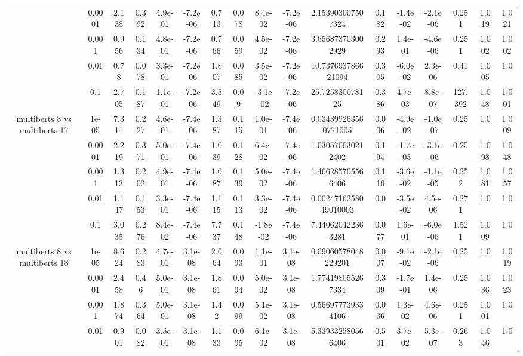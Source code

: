 \begin{tabular}{|c|c|c|c|c|c|c|c|c|c|c|c|c|c|c|c|c|}
 & 0.0001 & 2.138 & 0.392 & 4.9e-01 & -7.2e-06 & 0.713 & 0.078 & 8.4e-02 & -7.2e-06 & 2.153903007507324 & 0.182 & -1.4e-02 & -2.1e-06 & 0.251 & 1.019 & 1.021 \\
 & 0.001 & 0.956 & 0.134 & 4.8e-01 & -7.2e-06 & 0.766 & 0.059 & 4.5e-02 & -7.2e-06 & 3.656873703002929 & 0.293 & 1.4e-01 & -4.6e-06 & 0.251 & 1.002 & 1.002 \\
 & 0.01 & 0.78 & 0.078 & 3.3e-01 & -7.2e-06 & 1.807 & 0.085 & 3.5e-02 & -7.2e-06 & 10.737693786621094 & 0.305 & -6.0e-02 & 2.3e-06 & 0.41 & 1.005 & 1.0 \\
 & 0.1 & 2.705 & 0.187 & 1.1e-01 & -7.2e-06 & 3.549 & 0.09 & -3.1e-02 & -7.2e-06 & 25.725830078125 & 0.386 & 4.7e-03 & 8.8e-07 & 127.392 & 1.048 & 1.001 \\
\hline
\multirow{5}{*}{multiberts 8 vs multiberts 17} & 1e-05 & 7.311 & 0.227 & 4.6e-01 & -7.4e-06 & 1.387 & 0.115 & 1.0e-01 & -7.4e-06 & 0.034399263560771005 & 0.006 & -4.9e-02 & -1.0e-07 & 0.25 & 1.0 & 1.009 \\
 & 0.0001 & 2.219 & 0.371 & 5.0e-01 & -7.4e-06 & 1.039 & 0.128 & 6.4e-02 & -7.4e-06 & 1.030570030212402 & 0.194 & -1.7e-03 & -3.1e-06 & 0.25 & 1.098 & 1.048 \\
 & 0.001 & 1.313 & 0.202 & 4.9e-01 & -7.4e-06 & 1.087 & 0.139 & 5.0e-02 & -7.4e-06 & 1.466285705566406 & 0.118 & -3.6e-02 & -1.1e-05 & 0.252 & 1.081 & 1.057 \\
 & 0.01 & 1.147 & 0.153 & 3.3e-01 & -7.4e-06 & 1.115 & 0.113 & 3.3e-02 & -7.4e-06 & 0.0024716258049010003 & 0.0 & -3.5e-02 & 4.5e-06 & 0.271 & 1.0 & 1.0 \\
 & 0.1 & 3.035 & 0.276 & 8.4e-02 & -7.4e-06 & 7.737 & 0.148 & -1.8e-02 & -7.4e-06 & 7.440620422363281 & 0.077 & 1.6e-01 & -6.0e-06 & 1.521 & 1.009 & 1.0 \\
\hline
\multirow{5}{*}{multiberts 8 vs multiberts 18} & 1e-05 & 8.624 & 0.283 & 4.7e-01 & 3.1e-08 & 2.664 & 0.093 & 1.1e-01 & 3.1e-08 & 0.09060578048229201 & 0.007 & -9.1e-02 & -2.1e-06 & 0.25 & 1.0 & 1.019 \\
 & 0.0001 & 2.458 & 0.46 & 5.0e-01 & 3.1e-08 & 1.861 & 0.094 & 5.0e-02 & 3.1e-08 & 1.774198055267334 & 0.309 & -1.7e-01 & 1.4e-06 & 0.25 & 1.036 & 1.023 \\
 & 0.001 & 1.874 & 0.364 & 5.0e-01 & 3.1e-08 & 1.42 & 0.099 & 5.1e-02 & 3.1e-08 & 0.566977739334106 & 0.036 & 1.3e-02 & 4.6e-06 & 0.251 & 1.001 & 1.0 \\
 & 0.01 & 0.901 & 0.082 & 3.5e-01 & 3.1e-08 & 1.133 & 0.095 & 6.1e-02 & 3.1e-08 & 5.339332580566406 & 0.501 & 3.7e-02 & 5.3e-07 & 0.263 & 1.046 & 1.0 \\

\end{tabular}
